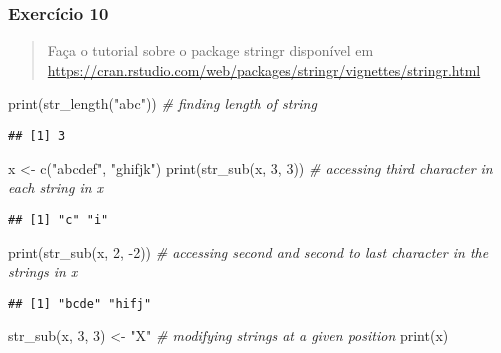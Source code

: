 \documentclass[
]{article}
\newenvironment{Shaded}{\begin{snugshade}}{\end{snugshade}}
\newcommand{\CommentTok}[1]{\textcolor[rgb]{0.56,0.35,0.01}{\textit{#1}}}
\newcommand{\DecValTok}[1]{\textcolor[rgb]{0.00,0.00,0.81}{#1}}
\newcommand{\FunctionTok}[1]{\textcolor[rgb]{0.00,0.00,0.00}{#1}}
\newcommand{\NormalTok}[1]{#1}
\newcommand{\OtherTok}[1]{\textcolor[rgb]{0.56,0.35,0.01}{#1}}
\newcommand{\SpecialCharTok}[1]{\textcolor[rgb]{0.00,0.00,0.00}{#1}}
\newcommand{\StringTok}[1]{\textcolor[rgb]{0.31,0.60,0.02}{#1}}
\begin{document}
\hypertarget{exercuxedcio-10}{%
\subsubsection{Exercício 10}\label{exercuxedcio-10}}

\begin{quote}
Faça o tutorial sobre o package stringr disponível em
\url{https://cran.rstudio.com/web/packages/stringr/vignettes/stringr.html}
\end{quote}

\begin{Shaded}
\begin{Highlighting}[]
\FunctionTok{print}\NormalTok{(}\FunctionTok{str\_length}\NormalTok{(}\StringTok{"abc"}\NormalTok{)) }\CommentTok{\# finding length of string}
\end{Highlighting}
\end{Shaded}

\begin{verbatim}
## [1] 3
\end{verbatim}

\begin{Shaded}
\begin{Highlighting}[]
\NormalTok{x }\OtherTok{\textless{}{-}} \FunctionTok{c}\NormalTok{(}\StringTok{"abcdef"}\NormalTok{, }\StringTok{"ghifjk"}\NormalTok{)}
\FunctionTok{print}\NormalTok{(}\FunctionTok{str\_sub}\NormalTok{(x, }\DecValTok{3}\NormalTok{, }\DecValTok{3}\NormalTok{)) }\CommentTok{\# accessing third character in each string in x}
\end{Highlighting}
\end{Shaded}

\begin{verbatim}
## [1] "c" "i"
\end{verbatim}

\begin{Shaded}
\begin{Highlighting}[]
\FunctionTok{print}\NormalTok{(}\FunctionTok{str\_sub}\NormalTok{(x, }\DecValTok{2}\NormalTok{, }\SpecialCharTok{{-}}\DecValTok{2}\NormalTok{)) }\CommentTok{\# accessing second and second to last character in the strings in x}
\end{Highlighting}
\end{Shaded}

\begin{verbatim}
## [1] "bcde" "hifj"
\end{verbatim}

\begin{Shaded}
\begin{Highlighting}[]
\FunctionTok{str\_sub}\NormalTok{(x, }\DecValTok{3}\NormalTok{, }\DecValTok{3}\NormalTok{) }\OtherTok{\textless{}{-}} \StringTok{"X"} \CommentTok{\# modifying strings at a given position}
\FunctionTok{print}\NormalTok{(x)}
\end{Highlighting}
\end{Shaded}
\end{document}
